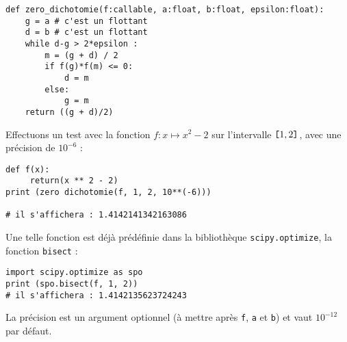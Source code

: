 \begin{lstlisting}
def zero_dichotomie(f:callable, a:float, b:float, epsilon:float):
    g = a # c'est un flottant
    d = b # c'est un flottant
    while d-g > 2*epsilon :
        m = (g + d) / 2
        if f(g)*f(m) <= 0:
            d = m
        else:
            g = m
    return ((g + d)/2)
\end{lstlisting}

Effectuons un test avec la fonction $f : x \mapsto x^2-2$ sur l'intervalle $\verb![!1,2\verb!]!$, avec une précision de $10^{-6}$ :
 
\begin{lstlisting}
def f(x):
     return(x ** 2 - 2)
print (zero dichotomie(f, 1, 2, 10**(-6)))

# il s'affichera : 1.4142141342163086
\end{lstlisting}
%
% 

Une telle fonction est déjà prédéfinie dans la bibliothèque \lstinline{scipy.optimize}, la fonction \lstinline{bisect} : 
\begin{lstlisting}
import scipy.optimize as spo
print (spo.bisect(f, 1, 2)) 
# il s'affichera : 1.4142135623724243
\end{lstlisting}
La précision est un argument optionnel (à mettre après \lstinline{f}, \lstinline{a} et \lstinline{b}) et vaut $10^{-12}$ par défaut.

